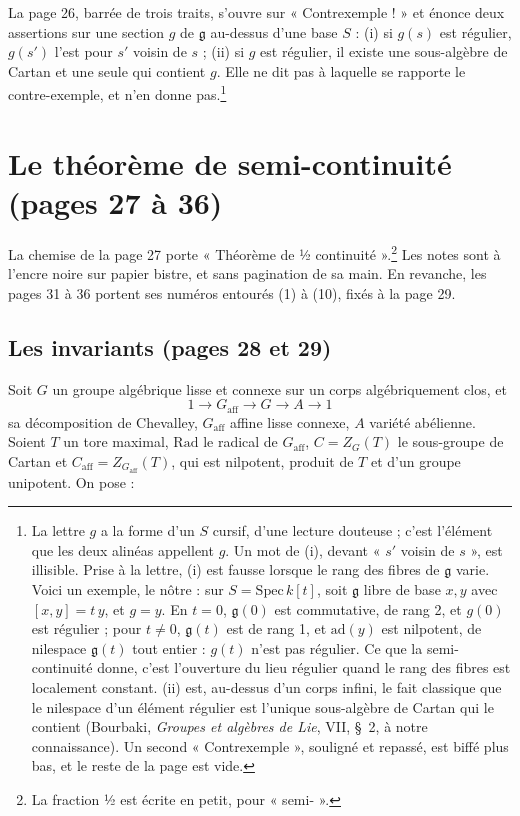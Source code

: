 \documentclass[11pt,a4paper]{article}
\begin{document}
La page 26, barrée de trois traits, s'ouvre sur « Contrexemple ! » et
énonce deux assertions sur une section $g$ de $\mathfrak{g}$ au-dessus d'une
base $S$ : (i) si $g(s)$ est régulier, $g(s')$ l'est pour $s'$ voisin de $s$ ;
(ii) si $g$ est régulier, il existe une sous-algèbre de Cartan et une seule
qui contient $g$. Elle ne dit pas à laquelle se rapporte le contre-exemple, et
n'en donne pas.\footnote{La lettre $g$ a la forme d'un $S$ cursif, d'une
lecture douteuse ; c'est l'élément que les deux alinéas appellent $g$. Un mot
de (i), devant « $s'$ voisin de $s$ », est illisible. Prise à la lettre, (i)
est fausse lorsque le rang des fibres de $\mathfrak{g}$ varie. Voici un
exemple, le nôtre : sur $S = \mathrm{Spec}\, k[t]$, soit $\mathfrak{g}$ libre
de base $x, y$ avec $[x, y] = t\,y$, et $g = y$. En $t = 0$, $\mathfrak{g}(0)$
est commutative, de rang 2, et $g(0)$ est régulier ; pour $t \neq 0$,
$\mathfrak{g}(t)$ est de rang 1, et $\mathrm{ad}(y)$ est nilpotent, de nilespace
$\mathfrak{g}(t)$ tout entier : $g(t)$ n'est pas régulier. Ce que la
semi-continuité donne, c'est l'ouverture du lieu régulier quand le rang des
fibres est localement constant. (ii) est, au-dessus d'un corps infini, le fait
classique que le nilespace d'un élément régulier est l'unique sous-algèbre de
Cartan qui le contient (Bourbaki, \emph{Groupes et algèbres de Lie}, VII,
§~2, à notre connaissance). Un second « Contrexemple », souligné et repassé, est
biffé plus bas, et le reste de la page est vide.}

\section*{Le théorème de semi-continuité (pages 27 à 36)}

La chemise de la page 27 porte « Théorème de ½ continuité ».\footnote{La
fraction ½ est écrite en petit, pour « semi- ».} Les notes sont à l'encre noire
sur papier bistre, et sans pagination de sa main. En revanche, les pages 31 à
36 portent ses numéros entourés (1) à (10), fixés à la page 29.

\subsection*{Les invariants (pages 28 et 29)}

Soit $G$ un groupe algébrique lisse et connexe sur un corps algébriquement
clos, et
\[
  1 \to G_{\mathrm{aff}} \to G \to A \to 1
\]
sa décomposition de Chevalley, $G_{\mathrm{aff}}$ affine lisse connexe, $A$
variété abélienne. Soient $T$ un tore maximal, $\mathrm{Rad}$ le radical de
$G_{\mathrm{aff}}$, $C = Z_{G}(T)$ le sous-groupe de Cartan et
$C_{\mathrm{aff}} = Z_{G_{\mathrm{aff}}}(T)$, qui est nilpotent, produit de $T$
et d'un groupe unipotent. On pose :
\end{document}

